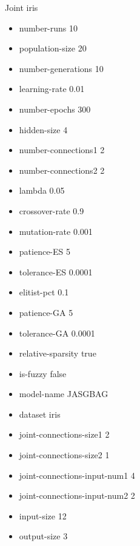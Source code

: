 Joint
iris
\begin{itemize}
\item number-runs 10
\item population-size 20
\item number-generations 10
\item learning-rate 0.01
\item number-epochs 300
\item hidden-size 4
\item number-connections1 2
\item number-connections2 2
\item lambda 0.05
\item crossover-rate 0.9
\item mutation-rate 0.001
\item patience-ES 5
\item tolerance-ES 0.0001
\item elitist-pct 0.1
\item patience-GA 5
\item tolerance-GA 0.0001
\item relative-sparsity true
\item is-fuzzy false
\item model-name JASGBAG
\item dataset iris
\item joint-connections-size1 2
\item joint-connections-size2 1
\item joint-connections-input-num1 4
\item joint-connections-input-num2 2
\item input-size 12
\item output-size 3
\end{itemize}

